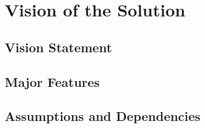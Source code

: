 \section{Vision of the Solution}
\subsection{Vision Statement}
%
  
\subsection{Major Features}

\subsection{Assumptions and Dependencies}

